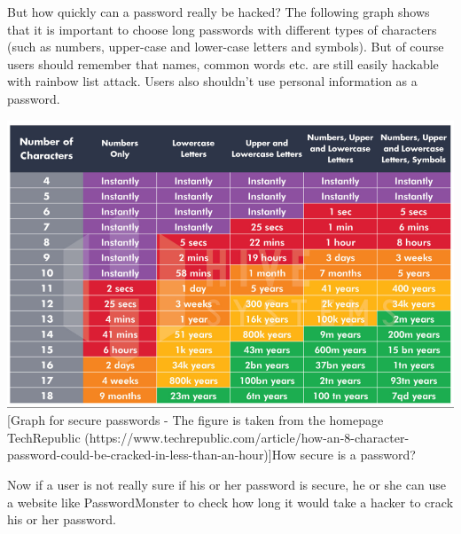 \documentclass[conference]{IEEEtran}
\begin{document}
But how quickly can a password really be hacked? The following graph shows that it is important to choose long passwords with different types of characters (such as numbers, upper-case and lower-case letters and symbols). But of course users should remember that names, common words etc. are still easily hackable with rainbow list attack. Users also shouldn't use personal information as a password.

\begin{center}
\includegraphics[scale=0.335]{./images/brute_force.png}
[Graph for secure passwords - The figure is taken from the homepage TechRepublic (https://www.techrepublic.com/article/how-an-8-character-password-could-be-cracked-in-less-than-an-hour)]{How secure is a password?}
\end{center}

Now if a user is not really sure if his or her password is secure, he or she can use a website like PasswordMonster to check how long it would take a hacker to crack his or her password.\cite{b9}
\end{document}
